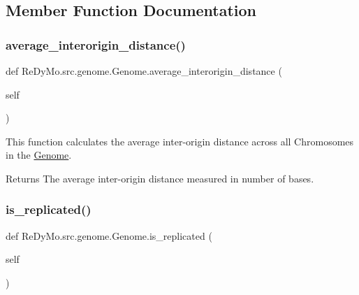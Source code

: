 \subsection{Member Function Documentation}
\mbox{\label{classReDyMo_1_1src_1_1genome_1_1Genome_a1c933cf2a91ad7dddeed4bc940c47ad2}} 
\subsubsection{\texorpdfstring{average\+\_\+interorigin\+\_\+distance()}{average\_interorigin\_distance()}}
{\footnotesize\ttfamily def Re\+Dy\+Mo.\+src.\+genome.\+Genome.\+average\+\_\+interorigin\+\_\+distance (\begin{DoxyParamCaption}\item[{}]{self }\end{DoxyParamCaption})}



This function calculates the average inter-\/origin distance across all Chromosomes in the \mbox{\hyperlink{classReDyMo_1_1src_1_1genome_1_1Genome}{Genome}}. 

\begin{DoxyReturn}{Returns}
The average inter-\/origin distance measured in number of bases. 
\end{DoxyReturn}
\mbox{\label{classReDyMo_1_1src_1_1genome_1_1Genome_a8351b706fc6f5c0f218c1dab6c04da46}} 
\subsubsection{\texorpdfstring{is\+\_\+replicated()}{is\_replicated()}}
{\footnotesize\ttfamily def Re\+Dy\+Mo.\+src.\+genome.\+Genome.\+is\+\_\+replicated (\begin{DoxyParamCaption}\item[{}]{self }\end{DoxyParamCaption})}




